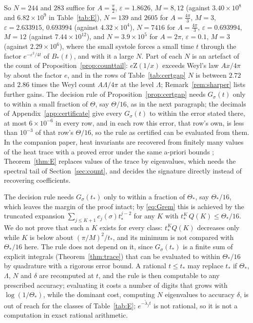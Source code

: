 \documentclass[pdflatex,sn-mathphys-num]{sn-jnl}
\theoremstyle{thmstyleone}%
\theoremstyle{thmstylethree}%
\newcommand{\cZ}{\mathrm{Z}}
\begin{document}
So $N=244$ and $283$ suffice for $A=\frac\pi2$, $\varepsilon=1.8626$, $M=8,12$ (against $3.40\times10^8$ and $6.82\times10^9$ in Table~\ref{tab:E}), $N=139$ and $2605$ for $A=\frac{4\pi}3$, $M=3$, $\varepsilon=2.633915$, $0.693994$ (against $4.32\times10^4$), $N=7416$ for $A=\frac{4\pi}3$, $\varepsilon=0.693994$, $M=12$ (against $7.44\times10^{12}$), and $N=3.9\times10^5$ for $A=2\pi$, $\varepsilon=0.1$, $M=3$ (against $2.29\times10^6$), where the small systole forces a small time $t$ through the factor $e^{-\varepsilon^2/4t}$ of $B_*(t)$, and with it a large $N$. Part of each $N$ is an artefact of the count of Proposition~\ref{prop:counttail}: $e\cZ(1/x)$ exceeds Weyl's law $Ax/4\pi$ by about the factor $e$, and in the rows of Table~\ref{tab:certgap} $N$ is between $2.72$ and $2.86$ times the Weyl count $A\Lambda/4\pi$ at the level $\Lambda$; Remark~\ref{rem:sharper} lists further gains. The decision rule of Proposition~\ref{prop:certgap} needs $G_\sigma(t)$ only to within a small fraction of $\Theta$, say $\Theta/16$, as in the next paragraph; the decimals of Appendix~\ref{app:certificate} give every $G_\sigma(t)$ to within the error stated there, at most $6\times10^{-6}$ in every row, and in each row this error, that row's own, is less than $10^{-3}$ of that row's $\Theta/16$, so the rule as certified can be evaluated from them. In the companion paper, heat invariants are recovered from finitely many values of the heat trace with a proved error under the same a-priori bounds \cite[Lemma~\ref*{A-lem:fromtrace}]{companionA}; Theorem~\ref{thm:E} replaces values of the trace by eigenvalues, which needs the spectral tail of Section~\ref{sec:count}, and decides the signature directly instead of recovering coefficients.

The decision rule needs $G_\sigma(t_*)$ only to within a fraction of $\Theta_*$, say $\Theta_*/16$, which leaves the margin of the proof intact; by \eqref{eq:Grem} this is achieved by the truncated expansion $\sum_{j\le K+1}c_j(\sigma)t_*^{j-2}$ for any $K$ with $t_*^K\,Q(K)\le\Theta_*/16$. We do not prove that such a $K$ exists for every class: $t_*^KQ(K)$ decreases only while $K$ is below about $(\pi/M)^2/t_*$, and its minimum is not compared with $\Theta_*/16$ here. The rule does not depend on it, since $G_\sigma(t_*)$ is a finite sum of explicit integrals (Theorem~\ref{thm:trace}) that can be evaluated to within $\Theta_*/16$ by quadrature with a rigorous error bound. A rational $t\le t_*$ may replace $t_*$ if $\Theta_*$, $\Lambda$, $N$ and $\delta$ are recomputed at $t$, and the rule is then computable to any prescribed accuracy; evaluating it costs a number of digits that grows with $\log(1/\Theta_*)$, while the dominant cost, computing $N$ eigenvalues to accuracy $\delta$, is out of reach for the classes of Table~\ref{tab:E}; $e^{-\tilde\lambda_jt}$ is not rational, so it is not a computation in exact rational arithmetic.
\end{document}
